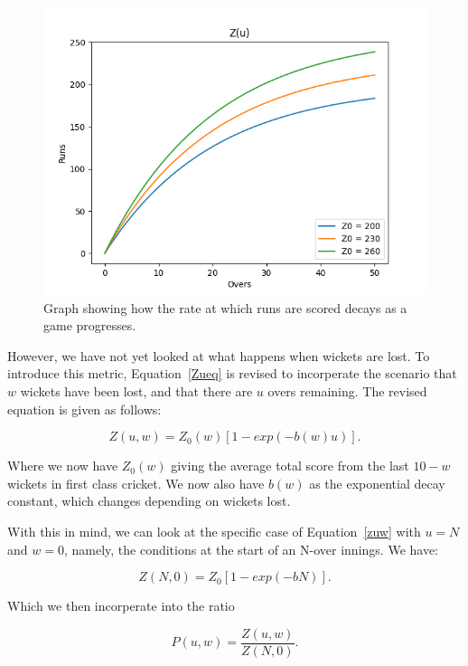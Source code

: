 \begin{figure}[h]
    \label{Zugraph}
    \centering
    \includegraphics[scale=0.6]{figures/z(u).png}
    \caption{Graph showing how the rate at which runs are scored decays as a game progresses.}
\end{figure}

However, we have not yet looked at what happens when wickets are lost. To introduce this metric, Equation~\ref{Zueq}
is revised to incorperate the scenario that $w$ wickets have been lost, and that there are $u$ overs remaining.
The revised equation is given as follows:

\begin{equation}
    Z(u,w) = Z_0(w)[1-exp(-b(w)u)].
    \label{zuw}
\end{equation}

Where we now have $Z_0(w)$ giving the average total score from the last $10-w$ wickets in first class cricket.
We now also have $b(w)$ as the exponential decay constant, which changes depending on wickets lost.

With this in mind, we can look at the specific case of Equation~\ref{zuw} with $u=N$ and $w=0$, namely, the conditions
at the start of an N-over innings. We have:

\begin{equation}
    Z(N,0) = Z_0[1-exp(-bN)].
    \label{zstart}
\end{equation}

Which we then incorperate into the ratio

\begin{equation}
    P(u,w) = \frac{Z(u,w)}{Z(N,0)}.
    \label{prat}
\end{equation}


